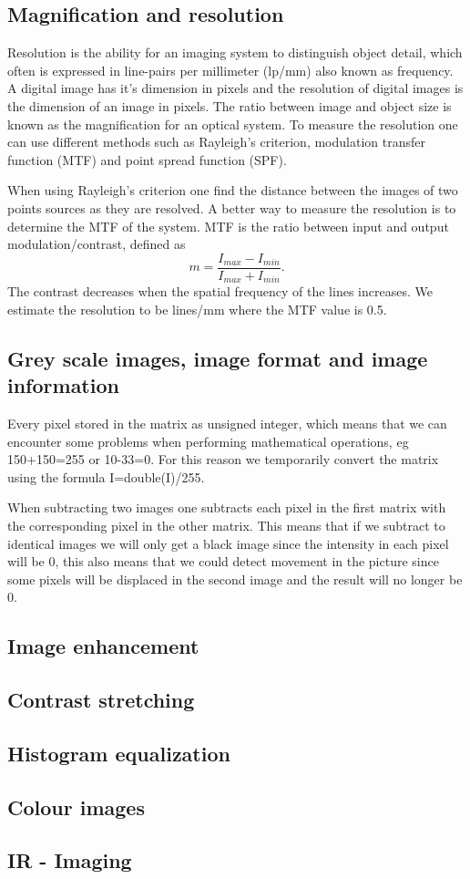 \subsection{Magnification and resolution}
Resolution is the ability for an imaging system to distinguish object detail, which often is expressed in line-pairs per millimeter (lp/mm) also known as frequency. A digital image has it's dimension in pixels and the resolution of digital images is the dimension of an image in pixels. The ratio between image and object size is known as the magnification for an optical system. To measure the resolution one can use different methods such as Rayleigh's criterion, modulation transfer function (MTF) and point spread function (SPF). 

When using Rayleigh's criterion one find the distance between the images of two points sources as they are resolved. A better way to measure the resolution is to determine the MTF of the system. 
% 
MTF is the ratio between input and output modulation/contrast, defined as \[ m = \frac{I_{max}-I_{min}}{I_{max}+I_{min}}. \] The contrast decreases when the spatial frequency of the lines increases. We estimate the resolution to be lines/mm where the MTF value is 0.5.

\subsection{Grey scale images, image format and image information}
Every pixel stored in the matrix as unsigned integer, which means that we can encounter some problems when performing mathematical operations, eg 150+150=255 or 10-33=0. For this reason we temporarily convert the matrix using the formula I=double(I)/255. 

When subtracting two images one subtracts each pixel in the first matrix with the corresponding pixel in the other matrix. %
This means that if we subtract to identical images we will only get a black image since the intensity in each pixel will be 0, this also means that we could detect movement in the picture since some pixels will be displaced in the second image and the result will no longer be 0.

\subsection{Image enhancement}

\subsection{Contrast stretching}

\subsection{Histogram equalization}

\subsection{Colour images}


\subsection{IR - Imaging}